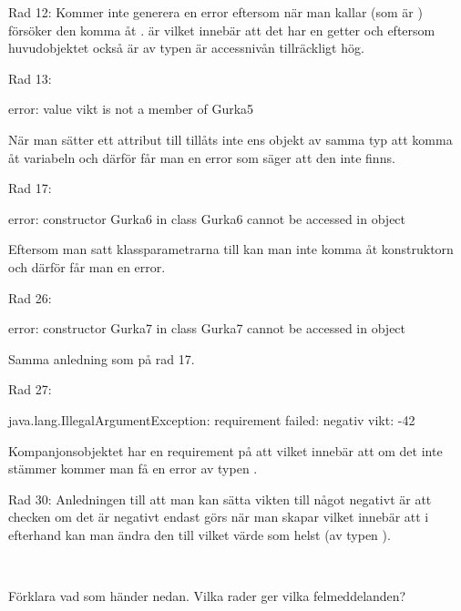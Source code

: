 Rad 12: Kommer inte generera en error eftersom när man kallar  (som är ) försöker den komma åt .  är  vilket innebär att det har en getter och eftersom huvudobjektet också är av typen  är accessnivån tillräckligt hög.

Rad 13:
\begin{REPL}
	error: value vikt is not a member of Gurka5
\end{REPL}
När man sätter ett attribut till  tillåts inte ens objekt av samma typ att komma åt variabeln och därför får man en error som säger att den inte finns.

Rad 17:
\begin{REPL}
	error: constructor Gurka6 in class Gurka6 cannot be accessed in object
\end{REPL}
Eftersom man satt klassparametrarna till  kan man inte komma åt konstruktorn och därför får man en error.

Rad 26:
\begin{REPL}
	error: constructor Gurka7 in class Gurka7 cannot be accessed in object
\end{REPL}
Samma anledning som på rad 17.

Rad 27:
\begin{REPL}
	java.lang.IllegalArgumentException: requirement failed: negativ vikt: -42
\end{REPL}
Kompanjonsobjektet har en requirement på att  vilket innebär att om det inte stämmer kommer man få en error av typen .

Rad 30: Anledningen till att man kan sätta vikten till något negativt är att checken om det är negativt endast görs när man skapar  vilket innebär att i efterhand kan man ändra den till vilket värde som helst (av typen ).


\QUESTEND







\QUESTBEGIN

\Task  \what~

\Subtask Förklara vad som händer nedan. Vilka rader ger vilka felmeddelanden?

